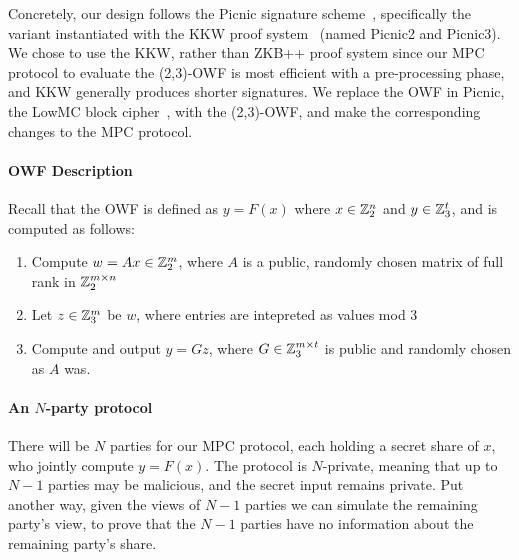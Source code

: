 Concretely, our design follows the Picnic signature scheme~\cite{CCS:CDGORR17},
specifically the variant instantiated with the KKW proof
system~\cite{CCS:KatKolWan18} (named Picnic2 and Picnic3).  We chose to use the
KKW, rather than ZKB++ proof system since our MPC protocol to evaluate the
(2,3)-OWF is most efficient with a pre-processing phase, and KKW generally
produces shorter signatures.  We replace the OWF in Picnic, the LowMC block cipher~\cite{EC:ARSTZ15}, 
with the (2,3)-OWF, and make the corresponding changes to the MPC protocol. 


\paragraph{OWF Description}
Recall that the OWF is defined as $y = F(x)$ where $x \in \mathbb{Z}_2^{n}$ and $y\in \mathbb{Z}_3^{t}$, and is computed as follows: 
\begin{enumerate}
\item Compute $w = Ax \in \mathbb{Z}_2^{m}$, where $A$ is a public, randomly chosen matrix of full rank in $\mathbb{Z}_2^{m\times n}$
\item Let $z\in\mathbb{Z}_3^{m}$ be $w$, where entries are intepreted as values mod 3
\item Compute and output $y = Gz$, where $G \in \mathbb{Z}_3^{m\times t}$ is public and randomly chosen as $A$ was. 
\end{enumerate}


\paragraph{An $N$-party protocol}
There will be $N$ parties for our MPC protocol, each holding a secret share of
$x$, who jointly compute $y = F(x)$.  The protocol is $N$-private, meaning that
up to $N-1$ parties may be malicious, and the secret input remains private.
Put another way, given the views of $N-1$ parties we can simulate the remaining
party's view, to prove that the $N-1$ parties have no information about the
remaining party's share. 

